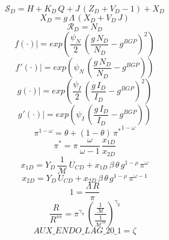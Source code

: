 \documentclass[10pt,a4paper]{article}
\begin{document}
\begin{dmath}
{\mathcal{S}_{D}}={H}+{K_D}\, {Q}+{J}\, \left({Z_D}+{V_D}-1\right)+{X_D}
\end{dmath}
\begin{dmath}
{X_D}={g}\, {\Lambda}\, \left({X_D}+{V_D}\, {J}\right)
\end{dmath}
\begin{dmath}
{\mathcal{R}_{D}}={N_D}
\end{dmath}
\begin{dmath}
{\left.       f\left( \cdot \right)            \right|}=exp\left(\frac{\psi_N}{2}\, \left(\frac{{g}\, {N_D}}{{N_D}}-g^{BGP}\right)^{2}\right)
\end{dmath}
\begin{dmath}
{\left.       f^‎{\prime}\left( \cdot \right)   \right|}=exp\left(\psi_N\, \left(\frac{{g}\, {N_D}}{{N_D}}-g^{BGP}\right)\right)
\end{dmath}
\begin{dmath}
{\left.       g\left( \cdot \right)            \right|}=exp\left(\frac{\psi_I}{2}\, \left(\frac{{g}\, {I_D}}{{I_D}}-g^{BGP}\right)^{2}\right)
\end{dmath}
\begin{dmath}
{\left.       g^‎{\prime}\left( \cdot \right)   \right|}=exp\left(\psi_I\, \left(\frac{{g}\, {I_D}}{{I_D}}-g^{BGP}\right)\right)
\end{dmath}
\begin{dmath}
{\pi}^{1-{\omega}}={\theta}+\left(1-{\theta}\right)\, {\pi^*}^{1-{\omega}}
\end{dmath}
\begin{dmath}
{\pi^*}={\pi}\, \frac{{\omega}}{{\omega}-1}\, \frac{{x_{1D}}}{{x_{2D}}}
\end{dmath}
\begin{dmath}
{x_{1D}}={Y_D}\, \frac{1}{\mathcal{M}}\, {U_{CD}}+{x_{1D}}\, \beta\, {\theta}\, {g}^{1-\rho}\, {\pi}^{{\omega}}
\end{dmath}
\begin{dmath}
{x_{2D}}={Y_D}\, {U_{CD}}+{x_{2D}}\, \beta\, {\theta}\, {g}^{1-\rho}\, {\pi}^{{\omega}-1}
\end{dmath}
\begin{dmath}
1=\frac{{\Lambda}\, {R}}{{\pi}}
\end{dmath}
\begin{dmath}
\frac{{R}}{{R^{ss}}}={\pi}^{{{\gamma}_{\pi}}}\, \left(\frac{\frac{1}{\mathcal{M}}}{\frac{1}{{\mathcal{M}^{ss}}}}\right)^{{{\gamma}_{y}}}
\end{dmath}
\begin{dmath}
AUX\_ENDO\_LAG\_20\_1={\zeta}
\end{dmath}
\end{document}
